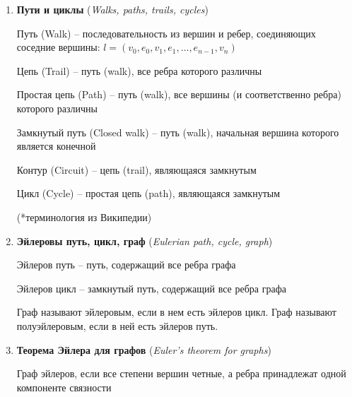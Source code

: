 \documentclass[12pt]{article}
\begin{document}
\begin{enumerate}
\begin{minipage}{\linewidth}
            Деление (Subdivision) ребра $\Pair{u, v}$ -- операция, добавляющее верщину $w$, ребра $\Pair{u, w}$ и $\Pair{w, v}$ и удаляющее ребро $\Pair{u, v}$

            Исключение (Smoothing) вершины $w$ (степени 2) -- операция, обратная делению -- исключение вершины $w$ и ребер $\Pair{u, w}$ и $\Pair{w, v}$ и добавление ребра $\Pair{u, v}$

            Графы $G$ и $H$ гомеоморфны, если граф $H$ можно получить в результате деления или исключения графа $G$

        \end{minipage}

        \smallvspace

        \item \textbf{Пути и циклы} (\textit{Walks, paths, trails, cycles})

        Путь (Walk) -- последовательность из вершин и ребер, соединяющих соседние вершины: $l = (v_0, e_0, v_1, e_1, \dots, e_{n - 1}, v_n)$

        Цепь (Trail) -- путь (walk), все ребра которого различны

        Простая цепь (Path) -- путь (walk), все вершины (и соответственно ребра) которого различны

        Замкнутый путь (Closed walk) -- путь (walk), начальная вершина которого является конечной

        Контур (Circuit) -- цепь (trail), являющаяся замкнутым

        Цикл (Cycle) -- простая цепь (path), являющаяся замкнутым

        (*терминология из Википедии)


        \item \textbf{Эйлеровы путь, цикл, граф} (\textit{Eulerian path, cycle, graph})

        Эйлеров путь -- путь, содержащий все ребра графа

        Эйлеров цикл -- замкнутый путь, содержащий все ребра графа

        Граф называют эйлеровым, если в нем есть эйлеров цикл. Граф называют полуэйлеровым, если в ней есть эйлеров путь.

        \item \textbf{Теорема Эйлера для графов} (\textit{Euler's theorem for graphs})

        Граф эйлеров, если все степени вершин четные, а ребра принадлежат одной компоненте связности


\end{enumerate}
\end{document}
